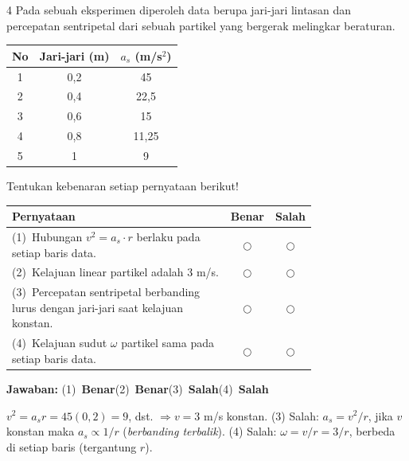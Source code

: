 \documentclass[11pt]{article}
\newcommand{\jawaban}[1]{%
  \noindent\colorbox{gold!30}{\parbox{\dimexpr\linewidth-2\fboxsep\relax}{%
    \textbf{Jawaban:} #1}}\par\smallskip}
\begin{document}
\begin{soal}{4}  %
Pada sebuah eksperimen diperoleh data berupa jari-jari lintasan dan
percepatan sentripetal dari sebuah partikel yang bergerak melingkar
beraturan.
\begin{center}
\begin{tabular}{ccc}
\hline
No & Jari-jari (m) & $a_s$ (m/s$^2$)\\
\hline
1 & 0,2 & 45 \\
2 & 0,4 & 22,5 \\
3 & 0,6 & 15 \\
4 & 0,8 & 11,25 \\
5 & 1   & 9 \\
\hline
\end{tabular}
\end{center}
Tentukan kebenaran setiap pernyataan berikut!

\par\smallskip
{\renewcommand{\arraystretch}{1.4}%
\begin{tabular}{@{}p{0.76\linewidth}cc@{}}
\hline
\textbf{Pernyataan} & \textbf{Benar} & \textbf{Salah}\\
\hline
(1)~Hubungan $v^2 = a_s \cdot r$ berlaku pada setiap baris data.
  & $\bigcirc$ & $\bigcirc$\\
(2)~Kelajuan linear partikel adalah 3 m/s.
  & $\bigcirc$ & $\bigcirc$\\
(3)~Percepatan sentripetal berbanding lurus dengan jari-jari
    saat kelajuan konstan.
  & $\bigcirc$ & $\bigcirc$\\
(4)~Kelajuan sudut $\omega$ partikel sama pada setiap baris data.
  & $\bigcirc$ & $\bigcirc$\\
\hline
\end{tabular}}
\end{soal}
\begin{pembox}
\jawaban{(1)~\textbf{Benar}\quad(2)~\textbf{Benar}\quad(3)~\textbf{Salah}\quad(4)~\textbf{Salah}}
$v^2 = a_s r = 45(0{,}2)=9$, dst. $\Rightarrow v=3$ m/s konstan.
(3) Salah: $a_s = v^2/r$, jika $v$ konstan maka $a_s \propto 1/r$ (\textit{berbanding terbalik}).
(4) Salah: $\omega = v/r = 3/r$, berbeda di setiap baris (tergantung $r$).
\end{pembox}
\end{document}
